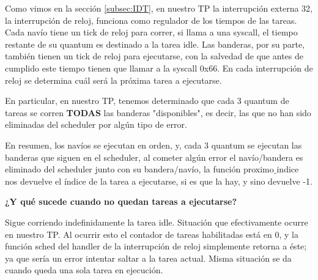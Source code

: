 \par{Como vimos en la sección \ref{subsec:IDT}, en nuestro TP la interrupción externa 32, la interrupción de reloj, funciona como regulador de los tiempos de las tareas. Cada navío tiene un tick de reloj para correr, si llama a una syscall, el tiempo restante de su quantum es destinado a la tarea idle. Las banderas, por su parte, también tienen un tick de reloj para ejecutarse, con la salvedad de que antes de cumplido este tiempo tienen que llamar a la syscall 0x66. En cada interrupción de reloj se determina cuál será la próxima tarea a ejecutarse.}
\par{En particular, en nuestro TP, tenemos determinado que cada 3 quantum de tareas se corren \textbf{TODAS} las banderas "disponibles", es decir, las que no han sido eliminadas del scheduler por algún tipo de error.}
\par{En resumen, los navíos se ejecutan en orden, y, cada 3 quantum se ejecutan las banderas que siguen en el scheduler, al cometer algún error el navío/bandera es eliminado del scheduler junto con su bandera/navío, la función proximo$\_$indice nos devuelve el índice de la tarea a ejecutarse, si es que la hay, y sino devuelve -1.} 
\medskip
\par{\textbf{¿Y qué sucede cuando no quedan tareas a ejecutarse?}}
\par{Sigue corriendo indefinidamente la tarea idle. Situación que efectivamente ocurre en nuestro TP. Al ocurrir esto el contador de tareas habilitadas está en 0, y la función sched del handler de la interrupción de reloj simplemente retorna a éste; ya que sería un error intentar saltar a la tarea actual. Misma situación se da cuando queda una sola tarea en ejecución.}